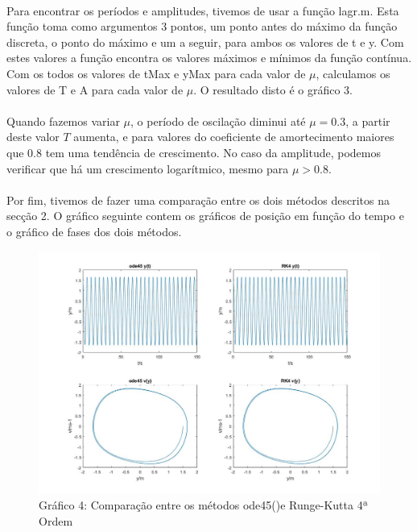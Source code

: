 \documentclass[a4paper, 11pt]{article}
\newcommand{\ode}{{\fontfamily{pcr}\selectfont ode45()}}
\newcommand{\m}{$\mu$}
\begin{document}
	\paragraph{}
	Para encontrar os períodos e amplitudes, tivemos de usar a função {\selectfont lagr.m}. Esta função toma como argumentos 3 pontos, um ponto antes do máximo da função discreta, o ponto do máximo e um a seguir, para ambos os valores de {\selectfont t} e {\selectfont y}. Com estes valores a função encontra os valores máximos e mínimos da função  contínua. \\
	Com os todos os valores de {\selectfont tMax} e {\selectfont yMax} para cada valor de \m, calculamos os valores de {\selectfont T} e {\selectfont A} para cada valor de \m. O resultado disto é o gráfico 3.

	\paragraph{}
	Quando fazemos variar \m, o período de oscilação diminui até \m$=0.3$, a partir deste valor $T$ aumenta, e para valores do coeficiente de amortecimento maiores que $0.8$ tem uma tendência de crescimento. No caso da amplitude, podemos verificar que há um crescimento logarítmico, mesmo para \m$>0.8$.
	
	\paragraph{}
	Por fim, tivemos de fazer uma comparação entre os dois métodos descritos na secção 2. O gráfico seguinte contem os gráficos de posição em função do tempo e o gráfico de fases dos dois métodos.
	\\
	\begin{figure}[h]
		\centering
		\captionsetup{labelformat=empty}
		\includegraphics[width=\textwidth, height=0.5\textwidth]{ode_rk4}
		\caption{\scriptsize Gráfico 4: Comparação entre os métodos \ode e Runge-Kutta 4ª Ordem}
	\end{figure}
	\\
\end{document}
